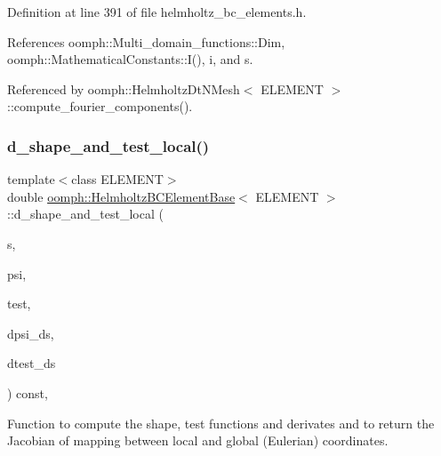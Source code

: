 Definition at line 391 of file helmholtz\+\_\+bc\+\_\+elements.\+h.



References oomph\+::\+Multi\+\_\+domain\+\_\+functions\+::\+Dim, oomph\+::\+Mathematical\+Constants\+::\+I(), i, and s.



Referenced by oomph\+::\+Helmholtz\+Dt\+N\+Mesh$<$ E\+L\+E\+M\+E\+N\+T $>$\+::compute\+\_\+fourier\+\_\+components().

\mbox{\label{classoomph_1_1HelmholtzBCElementBase_ab3183e6c6d742852fc890742a4e06d3f}} 
\subsubsection{\texorpdfstring{d\+\_\+shape\+\_\+and\+\_\+test\+\_\+local()}{d\_shape\_and\_test\_local()}}
{\footnotesize\ttfamily template$<$class E\+L\+E\+M\+E\+NT$>$ \\
double \hyperlink{classoomph_1_1HelmholtzBCElementBase}{oomph\+::\+Helmholtz\+B\+C\+Element\+Base}$<$ E\+L\+E\+M\+E\+NT $>$\+::d\+\_\+shape\+\_\+and\+\_\+test\+\_\+local (\begin{DoxyParamCaption}\item[{const \hyperlink{classoomph_1_1Vector}{Vector}$<$ double $>$ \&}]{s,  }\item[{\hyperlink{classoomph_1_1Shape}{Shape} \&}]{psi,  }\item[{\hyperlink{classoomph_1_1Shape}{Shape} \&}]{test,  }\item[{\hyperlink{classoomph_1_1DShape}{D\+Shape} \&}]{dpsi\+\_\+ds,  }\item[{\hyperlink{classoomph_1_1DShape}{D\+Shape} \&}]{dtest\+\_\+ds }\end{DoxyParamCaption}) const\hspace{0.3cm}{\ttfamily [inline]}, {\ttfamily [protected]}}



Function to compute the shape, test functions and derivates and to return the Jacobian of mapping between local and global (Eulerian) coordinates. 



